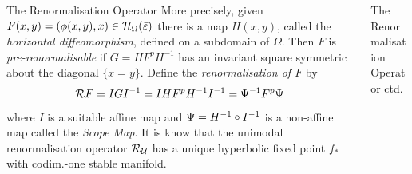 \documentclass[final,hyperref={pdfpagelabels=false}]{beamer}
\theoremstyle{plain}%
\theoremstyle{definition}
\theoremstyle{remark}
\begin{document}
\begin{frame}{}
\begin{columns}[t]
\begin{column}{0.3\linewidth}
\begin{block}{The Renormalisation Operator}
More precisely, given $F(x,y)=(\phi(x,y),x)\in \mathcal H_{\Omega}(\bar{\varepsilon})$ there is a map $H(x,y)$, called the \emph{horizontal diffeomorphism}, defined on a subdomain of $\Omega$. Then $F$ is \emph{pre-renormalisable} if $G=HF^pH^{-1}$ has an invariant square symmetric about the diagonal $\{x=y\}$.
Define the \emph{renormalisation of $F$} by 
\begin{equation}
\mathcal{R} F=IGI^{-1}=IHF^pH^{-1}I^{-1}=\Psi^{-1} F^p\Psi
\end{equation}
where $I$ is a suitable affine map and $\Psi=H^{-1}\circ I^{-1}$ is a non-affine map called the \emph{Scope Map}.
\vskip 20pt
It is know that the unimodal renormalisation operator $\mathcal{R}_\mathcal{U}$ has a unique hyperbolic fixed point $f_*$ with codim.-one stable manifold.
\vskip 5pt
\end{block}
\end{column}



\begin{column}{0.3\linewidth}
\begin{block}{The Renormalisation Operator ctd.}
\begin{figure}[htp]
\centering
\tiny
{}



\end{figure}
\end{block}
\end{column}
\end{columns}
\end{frame}
\end{document}

